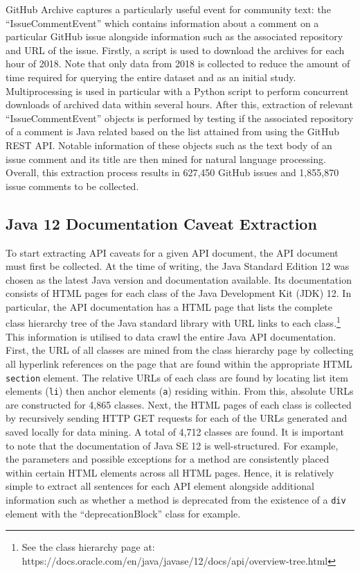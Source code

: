 GitHub Archive captures a particularly useful event for community text: the ``IssueCommentEvent'' which contains information about a comment on a particular GitHub issue alongside information such as the associated repository and URL of the issue. Firstly, a script is used to download the archives for each hour of 2018. Note that only data from 2018 is collected to reduce the amount of time required for querying the entire dataset and as an initial study. Multiprocessing is used in particular with a Python script to perform concurrent downloads of archived data within several hours. After this, extraction of relevant ``IssueCommentEvent'' objects is performed by testing if the associated repository of a comment is Java related based on the list attained from using the GitHub REST API. Notable information of these objects such as the text body of an issue comment and its title are then mined for natural language processing. Overall, this extraction process results in 627,450 GitHub issues and 1,855,870 issue comments to be collected.

\subsection{Java 12 Documentation Caveat Extraction}
\label{subsec:info-caveat-extract}
To start extracting API caveats for a given API document, the API document must first be collected. At the time of writing, the Java Standard Edition 12 was chosen as the latest Java version and documentation available. Its documentation consists of HTML pages for each class of the Java Development Kit (JDK) 12. In particular, the API documentation has a HTML page that lists the complete class hierarchy tree of the Java standard library with URL links to each class.\footnote{See the class hierarchy page at: https://docs.oracle.com/en/java/javase/12/docs/api/overview-tree.html} This information is utilised to data crawl the entire Java API documentation. First, the URL of all classes are mined from the class hierarchy page by collecting all hyperlink references on the page that are found within the appropriate HTML \lstinline{section} element. The relative URLs of each class are found by locating list item elements (\lstinline{li}) then anchor elements (\lstinline{a}) residing within. From this, absolute URLs are constructed for 4,865 classes. Next, the HTML pages of each class is collected by recursively sending HTTP GET requests for each of the URLs generated and saved locally for data mining. A total of 4,712 classes are found. It is important to note that the documentation of Java SE 12 is well-structured. For example, the parameters and possible exceptions for a method are consistently placed within certain HTML elements across all HTML pages. Hence, it is relatively simple to extract all sentences for each API element alongside additional information such as whether a method is deprecated from the existence of a \lstinline{div} element with the ``deprecationBlock'' class for example.\\

